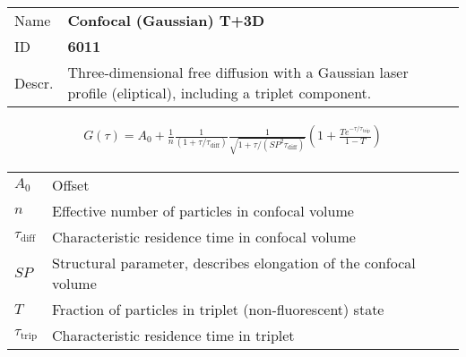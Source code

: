 

\noindent \begin{tabular}{lp{}}
Name & \textbf{Confocal (Gaussian) T+3D} \\ 
ID & \textbf{6011} \\ 
Descr. &  Three-dimensional free diffusion with a Gaussian laser profile (eliptical), including a triplet component\cite{Widengren1994, Widengren1995, Haupts1998}. \\ 
\end{tabular}
\begin{align}
G(\tau) = A_0 + \frac{1}{n} \frac{1}{(1+\tau/\tau_\mathrm{diff})} \frac{1}{\sqrt{1+\tau/(\mathit{SP}^2 \tau_\mathrm{ diff})}} \left(1 + \frac{T e^{-\tau/\tau_\mathrm{trip}}}{1-T}  \right)
\end{align} 
\begin{center}
\begin{tabular}{ll}
$A_0$ & Offset \\ 
$n$ & Effective number of particles in confocal volume \\ 
$\tau_\mathrm{diff}$ &  Characteristic residence time in confocal volume \\ 
$\mathit{SP}$ & Structural parameter, describes elongation of the confocal volume \\
$T$ &  Fraction of particles in triplet (non-fluorescent) state\\ 
$\tau_\mathrm{trip}$ &  Characteristic residence time in triplet \\
\end{tabular}
\end{center}
\vspace{2em}



